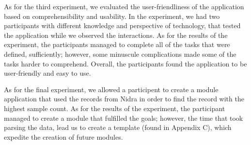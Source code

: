As for the third experiment, we evaluated the user-friendliness of the application based on comprehensibility and usability. In the experiment, we had two participants with different knowledge and perspective of technology, that tested the application while we observed the interactions. As for the results of the experiment, the participants managed to complete all of the tasks that were defined, sufficiently; however, some minuscule complications made some of the tasks harder to comprehend. Overall, the participants found the application to be user-friendly and easy to use. 

As for the final experiment, we allowed a participent to create a module application that used the records from Nidra in order to find the record with the highest sample count. As for the results of the experiment, the participant managed to create a module that fulfilled the goals; however, the time that took parsing the data, lead us to create a template (found in Appendix C), which expedite the creation of future modules. 
